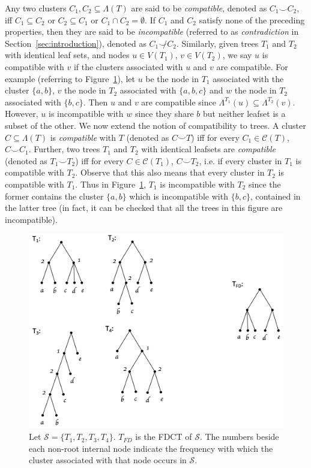 \documentclass{article}
\newcommand{\compatible}{\smile}
\newcommand{\leafset}{\Lambda}
\begin{document}
    Any two clusters $C_1, C_2 \subseteq \leafset(T)$ are said to be \textit{compatible}, denoted as $C_1 \compatible C_2$, iff $C_1 \subseteq C_2$ or $C_2 \subseteq C_1$ or $C_1 \cap C_2 = \emptyset$. If $C_1$ and $C_2$ satisfy none of the preceding properties, then they are said to be \textit{incompatible} (referred to as \textit{contradiction} in Section~\ref{sec:introduction}), denoted as $C_1 \not\compatible C_2$. Similarly, given trees $T_1$ and $T_2$ with identical leaf sets, and nodes $u \in V(T_1)$, $v \in V(T_2)$, we say $u$ is compatible with $v$ if the clusters associated with $u$ and $v$ are compatible. For example (referring to Figure~\ref{fig:freqdiff}), let $u$ be the node in $T_1$ associated with the cluster $\{a, b\}$, $v$ the node in $T_2$ associated with $\{a, b, c\}$ and $w$ the node in $T_2$ associated with $\{b, c\}$. Then $u$ and $v$ are compatible since $\leafset^{T_1}(u) \subseteq \leafset^{T_2}(v)$. However, $u$ is incompatible with $w$ since they share $b$ but neither leafset is a subset of the other. We now extend the notion of compatibility to trees. A cluster $C \subseteq \leafset(T)$ is \textit{compatible} with $T$ (denoted as $C \compatible T$) iff for every $C_1 \in \mathcal{C}(T)$, $C \compatible C_1$. Further, two trees $T_1$ and $T_2$ with identical leafsets are \textit{compatible} (denoted as $T_1 \compatible T_2$) iff for every $C \in \mathcal{C}(T_1)$, $C \compatible T_2$, i.e. if every cluster in $T_1$ is compatible with $T_2$. Observe that this also means that every cluster in $T_2$ is compatible with $T_1$. Thus in Figure~\ref{fig:freqdiff}, $T_1$ is incompatible with $T_2$ since the former contains the cluster $\{a, b\}$ which is incompatible with $\{b, c\}$, contained in the latter tree (in fact, it can be checked that all the trees in this figure are incompatible).

    \begin{figure}[h]
        \includegraphics[scale=0.5]{freqdiff}
        \centering
        \caption{Let $\mathcal{S} = \{T_1, T_2, T_3, T_4\}$. $T_{FD}$ is the FDCT of $\mathcal{S}$. The numbers beside each non-root internal node indicate the frequency with which the cluster associated with that node occurs in $\mathcal{S}$.}
        \label{fig:freqdiff}
    \end{figure}
\end{document}
